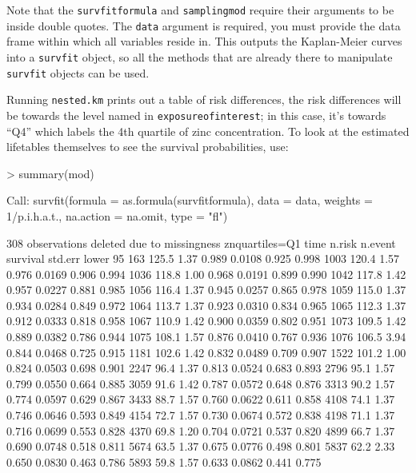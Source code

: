 \documentclass[10pt]{article}
\begin{document}
Note that the \texttt{survfitformula} and \texttt{samplingmod} require their arguments to
be inside double quotes.  The \texttt{data} argument is required, you must provide the
data frame within which all variables reside in.  This outputs the Kaplan-Meier curves
into a \texttt{survfit} object, so all the methods that are already there to manipulate
\texttt{survfit} objects can be used.

Running \texttt{nested.km} prints out a table of risk differences, the risk
differences will be towards the level named in \texttt{exposureofinterest}; in this case,
it's towards ``Q4'' which labels the 4th quartile of zinc concentration.  To look at the
estimated lifetables themselves to see the survival probabilities, use:
\begin{Schunk}
\begin{Sinput}
> summary(mod)
\end{Sinput}
\begin{Soutput}
Call: survfit(formula = as.formula(survfitformula), data = data, weights = 1/p.i.h.a.t., 
    na.action = na.omit, type = "fl")

308 observations deleted due to missingness 
                znquartiles=Q1 
 time n.risk n.event survival std.err lower 95%
  163  125.5    1.37    0.989  0.0108        0.925        0.998
 1003  120.4    1.57    0.976  0.0169        0.906        0.994
 1036  118.8    1.00    0.968  0.0191        0.899        0.990
 1042  117.8    1.42    0.957  0.0227        0.881        0.985
 1056  116.4    1.37    0.945  0.0257        0.865        0.978
 1059  115.0    1.37    0.934  0.0284        0.849        0.972
 1064  113.7    1.37    0.923  0.0310        0.834        0.965
 1065  112.3    1.37    0.912  0.0333        0.818        0.958
 1067  110.9    1.42    0.900  0.0359        0.802        0.951
 1073  109.5    1.42    0.889  0.0382        0.786        0.944
 1075  108.1    1.57    0.876  0.0410        0.767        0.936
 1076  106.5    3.94    0.844  0.0468        0.725        0.915
 1181  102.6    1.42    0.832  0.0489        0.709        0.907
 1522  101.2    1.00    0.824  0.0503        0.698        0.901
 2247   96.4    1.37    0.813  0.0524        0.683        0.893
 2796   95.1    1.57    0.799  0.0550        0.664        0.885
 3059   91.6    1.42    0.787  0.0572        0.648        0.876
 3313   90.2    1.57    0.774  0.0597        0.629        0.867
 3433   88.7    1.57    0.760  0.0622        0.611        0.858
 4108   74.1    1.37    0.746  0.0646        0.593        0.849
 4154   72.7    1.57    0.730  0.0674        0.572        0.838
 4198   71.1    1.37    0.716  0.0699        0.553        0.828
 4370   69.8    1.20    0.704  0.0721        0.537        0.820
 4899   66.7    1.37    0.690  0.0748        0.518        0.811
 5674   63.5    1.37    0.675  0.0776        0.498        0.801
 5837   62.2    2.33    0.650  0.0830        0.463        0.786
 5893   59.8    1.57    0.633  0.0862        0.441        0.775


\end{Soutput}
\end{Schunk}
\end{document}
